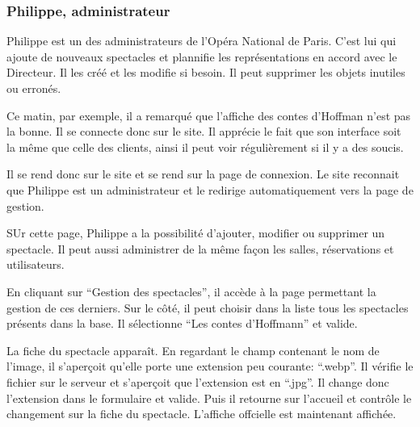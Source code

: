 \subsubsection{Philippe, administrateur}\label{philippe-administrateur}

Philippe est un des administrateurs de l'Opéra National de Paris. C'est
lui qui ajoute de nouveaux spectacles et plannifie les représentations
en accord avec le Directeur. Il les créé et les modifie si besoin. Il
peut supprimer les objets inutiles ou erronés.

Ce matin, par exemple, il a remarqué que l'affiche des contes d'Hoffman
n'est pas la bonne. Il se connecte donc sur le site. Il apprécie le fait
que son interface soit la même que celle des clients, ainsi il peut voir
régulièrement si il y a des soucis.

Il se rend donc sur le site et se rend sur la page de connexion. Le site
reconnait que Philippe est un administrateur et le redirige
automatiquement vers la page de gestion.

SUr cette page, Philippe a la possibilité d'ajouter, modifier ou
supprimer un spectacle. Il peut aussi administrer de la même façon les
salles, réservations et utilisateurs.

En cliquant sur ``Gestion des spectacles'', il accède à la page
permettant la gestion de ces derniers. Sur le côté, il peut choisir dans
la liste tous les spectacles présents dans la base. Il sélectionne ``Les
contes d'Hoffmann'' et valide.

La fiche du spectacle apparaît. En regardant le champ contenant le nom
de l'image, il s'aperçoit qu'elle porte une extension peu courante:
``.webp''. Il vérifie le fichier sur le serveur et s'aperçoit que
l'extension est en ``.jpg''. Il change donc l'extension dans le
formulaire et valide. Puis il retourne sur l'accueil et contrôle le
changement sur la fiche du spectacle. L'affiche offcielle est maintenant
affichée.
